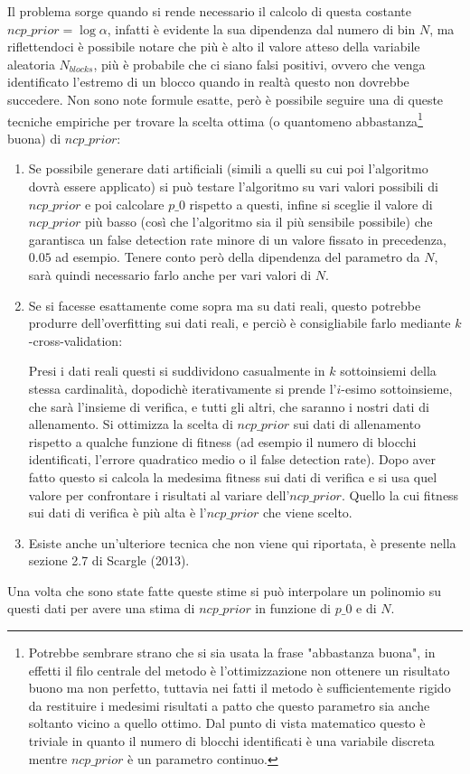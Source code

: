 \documentclass[10pt,a4paper]{report}
\begin{document}
Il problema sorge quando si rende necessario il calcolo di questa costante $ncp\_prior=\log\alpha$, infatti è evidente la sua dipendenza dal numero di bin $N$, ma riflettendoci è possibile notare che più è alto il valore atteso della variabile aleatoria $N_{blocks}$, più è probabile che ci siano falsi positivi, ovvero che venga identificato l'estremo di un blocco quando in realtà questo non dovrebbe succedere. Non sono note formule esatte, però è possibile seguire una di queste tecniche empiriche per trovare la scelta ottima (o quantomeno abbastanza\footnote{Potrebbe sembrare strano che si sia usata la frase "abbastanza buona", in effetti il filo centrale del metodo è l'ottimizzazione non ottenere un risultato buono ma non perfetto, tuttavia nei fatti il metodo è sufficientemente rigido da restituire i medesimi risultati a patto che questo parametro sia anche soltanto vicino a quello ottimo. Dal punto di vista matematico questo è triviale in quanto il numero di blocchi identificati è una variabile discreta mentre $ncp\_prior$ è un parametro continuo.} buona) di $ncp\_prior$:
\begin{enumerate}
\item Se possibile generare dati artificiali (simili a quelli su cui poi l'algoritmo dovrà essere applicato) si può testare l'algoritmo su vari valori possibili di $ncp\_prior$ e poi calcolare $p\_0$ rispetto a questi, infine si sceglie il valore di $ncp\_prior$ più basso (così che l'algoritmo sia il più sensibile possibile) che garantisca un false detection rate minore di un valore fissato in precedenza, $0.05$ ad esempio. Tenere conto però della dipendenza del parametro da $N$, sarà quindi necessario farlo anche per vari valori di $N$.
\item Se si facesse esattamente come sopra ma su dati reali, questo potrebbe produrre dell'overfitting sui dati reali, e perciò è consigliabile farlo mediante $k$-cross-validation:

Presi i dati reali questi si suddividono casualmente in $k$ sottoinsiemi della stessa cardinalità, dopodichè iterativamente si prende l'$i$-esimo sottoinsieme, che sarà l'insieme di verifica, e tutti gli altri, che saranno i nostri dati di allenamento. Si ottimizza la scelta di $ncp\_prior$ sui dati di allenamento rispetto a qualche funzione di fitness (ad esempio il numero di blocchi identificati, l'errore quadratico medio o il false detection rate). Dopo aver fatto questo si calcola la medesima fitness sui dati di verifica e si usa quel valore per confrontare i risultati al variare dell'$ncp\_prior$. Quello la cui fitness sui dati di verifica è più alta è l'$ncp\_prior$ che viene scelto.
\item Esiste anche un'ulteriore tecnica che non viene qui riportata, è presente nella sezione 2.7 di Scargle (2013).
\end{enumerate}
Una volta che sono state fatte queste stime si può interpolare un polinomio su questi dati per avere una stima di $ncp\_prior$ in funzione di $p\_0$ e di $N$.
\end{document}
